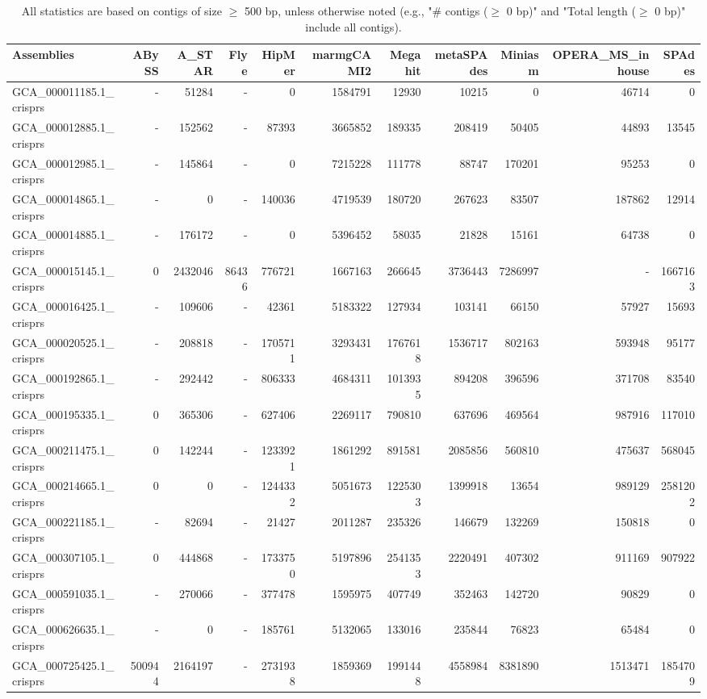 \documentclass[12pt,a4paper]{article}
\begin{document}
\begin{table}[ht]
\begin{center}
\caption{All statistics are based on contigs of size $\geq$ 500 bp, unless otherwise noted (e.g., "\# contigs ($\geq$ 0 bp)" and "Total length ($\geq$ 0 bp)" include all contigs).}
\begin{tabular}{|l*{10}{|r}|}
\hline
Assemblies & ABySS & A\_STAR & Flye & HipMer & marmgCAMI2 & Megahit & metaSPAdes & Miniasm & OPERA\_MS\_inhouse & SPAdes \\ \hline
GCA\_000011185.1\_crisprs & - & 51284 & - & 0 & 1584791 & 12930 & 10215 & 0 & 46714 & 0 \\ \hline
GCA\_000012885.1\_crisprs & - & 152562 & - & 87393 & 3665852 & 189335 & 208419 & 50405 & 44893 & 13545 \\ \hline
GCA\_000012985.1\_crisprs & - & 145864 & - & 0 & 7215228 & 111778 & 88747 & 170201 & 95253 & 0 \\ \hline
GCA\_000014865.1\_crisprs & - & 0 & - & 140036 & 4719539 & 180720 & 267623 & 83507 & 187862 & 12914 \\ \hline
GCA\_000014885.1\_crisprs & - & 176172 & - & 0 & 5396452 & 58035 & 21828 & 15161 & 64738 & 0 \\ \hline
GCA\_000015145.1\_crisprs & 0 & 2432046 & 86436 & 776721 & 1667163 & 266645 & 3736443 & 7286997 & - & 1667163 \\ \hline
GCA\_000016425.1\_crisprs & - & 109606 & - & 42361 & 5183322 & 127934 & 103141 & 66150 & 57927 & 15693 \\ \hline
GCA\_000020525.1\_crisprs & - & 208818 & - & 1705711 & 3293431 & 1767618 & 1536717 & 802163 & 593948 & 95177 \\ \hline
GCA\_000192865.1\_crisprs & - & 292442 & - & 806333 & 4684311 & 1013935 & 894208 & 396596 & 371708 & 83540 \\ \hline
GCA\_000195335.1\_crisprs & 0 & 365306 & - & 627406 & 2269117 & 790810 & 637696 & 469564 & 987916 & 117010 \\ \hline
GCA\_000211475.1\_crisprs & 0 & 142244 & - & 1233921 & 1861292 & 891581 & 2085856 & 560810 & 475637 & 568045 \\ \hline
GCA\_000214665.1\_crisprs & 0 & 0 & - & 1244332 & 5051673 & 1225303 & 1399918 & 13654 & 989129 & 2581202 \\ \hline
GCA\_000221185.1\_crisprs & - & 82694 & - & 21427 & 2011287 & 235326 & 146679 & 132269 & 150818 & 0 \\ \hline
GCA\_000307105.1\_crisprs & 0 & 444868 & - & 1733750 & 5197896 & 2541353 & 2220491 & 407302 & 911169 & 907922 \\ \hline
GCA\_000591035.1\_crisprs & - & 270066 & - & 377478 & 1595975 & 407749 & 352463 & 142720 & 90829 & 0 \\ \hline
GCA\_000626635.1\_crisprs & - & 0 & - & 185761 & 5132065 & 133016 & 235844 & 76823 & 65484 & 0 \\ \hline
GCA\_000725425.1\_crisprs & 500944 & 2164197 & - & 2731938 & 1859369 & 1991448 & 4558984 & 8381890 & 1513471 & 1854709 \\ \hline
\end{tabular}
\end{center}
\end{table}
\end{document}

